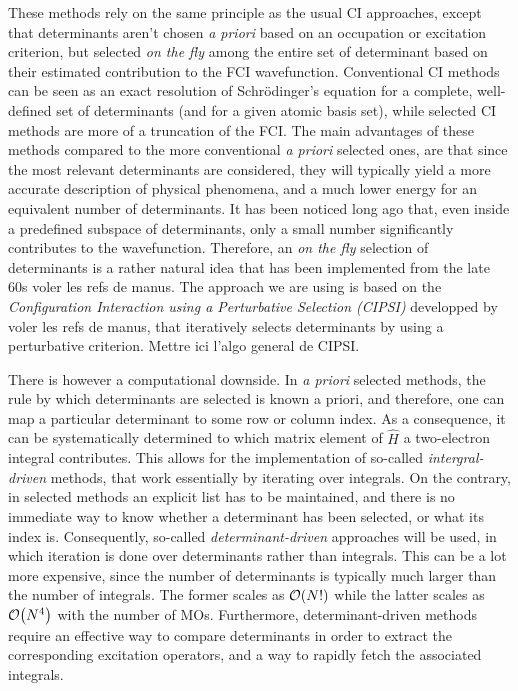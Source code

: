\documentclass[./thesis.tex]{subfiles}
\begin{document}
These methods rely on the same principle as the usual CI approaches, except that determinants aren't chosen \textit{a priori} based on an occupation or excitation criterion, but selected \emph{on the fly} among the entire set of determinant based on their estimated contribution to the FCI wavefunction. Conventional CI methods can be seen as an exact resolution of Schrödinger's equation for a complete, well-defined set of determinants (and for a given atomic basis set), while selected CI methods are more of a truncation of the FCI.
The main advantages of these methods compared to the more conventional \textit{a priori} selected ones, are that since the most relevant determinants are considered, they will typically yield a more accurate description of physical phenomena, and a much lower energy for an equivalent number of determinants.
It has been noticed long ago that, even inside a predefined subspace of determinants, only a small number significantly contributes to the wavefunction. Therefore, an \emph{on the fly} selection of determinants is a rather natural idea that has been implemented from the late 60s \alert{voler les refs de manus}. The approach we are using is based on the \emph{Configuration Interaction using a Perturbative Selection (CIPSI)} developped by \alert{voler les refs de manus}, that iteratively selects determinants by using a perturbative criterion.  \alert{Mettre ici l'algo general de CIPSI}.

There is however a computational downside. In \textit{a priori} selected methods, the rule by which determinants are selected is known a priori, and therefore, one can map a particular determinant to some row or column index.\cite{Knowles_1984} As a consequence, it can be systematically determined to which matrix element of $\widehat{H}$ a two-electron integral contributes. This allows for the implementation of so-called \emph{intergral-driven} methods, that work essentially by iterating over integrals.
On the contrary, in selected methods an explicit list has to be maintained, and there is no immediate way to know whether a determinant has been selected, or what its index is. Consequently, so-called \emph{determinant-driven} approaches will be used, in which iteration is done over determinants rather than integrals. This can be a lot more expensive, since the number of determinants is typically much larger than the number of integrals. The former scales as $\order{N!}$ while the latter scales as $\order{N^4}$ with the number of MOs.
Furthermore, determinant-driven methods require an effective way to compare determinants in order to extract the corresponding excitation operators, and a way to rapidly fetch the associated integrals.
\end{document}
